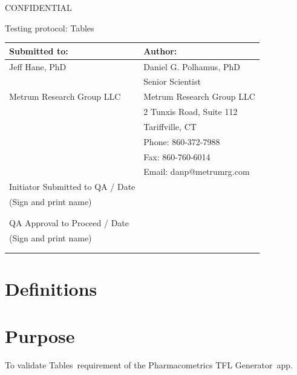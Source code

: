 \documentclass{article}
\newcommand{\tfl}{Pharmacometrics TFL Generator}
\newcommand{\topic}{Tables}
\begin{document}
\begin{center}
{\large CONFIDENTIAL} 


\vspace*{1cm}


\vspace*{1cm}

{\huge Testing protocol: \topic}
\vspace{3.0cm}

\begin{tabular}{|l|l|}\hline
Submitted to: & Author:\\\hline
Jeff Hane, PhD & Daniel G. Polhamus, PhD \\
&Senior Scientist\\
Metrum Research Group LLC & Metrum Research Group LLC\\
 & 2 Tunxis Road, Suite 112\\
  & Tariffville, CT\\
  & Phone: 860-372-7988 \\
 & Fax: 860-760-6014 \\
  & Email: danp@metrumrg.com \\\hline

  Initiator Submitted to QA  / Date & \\
  
 (Sign and print name) & \\
  & \\
  & \\\hline
  
QA Approval to Proceed / Date & \\

 (Sign and print name) & \\
  & \\
 & \\\hline

\end{tabular}

\end{center}

\newpage
\vspace{3in}
\section*{Definitions}


\section*{Purpose}
To validate \topic\ requirement of the \tfl\ app.
\end{document}
